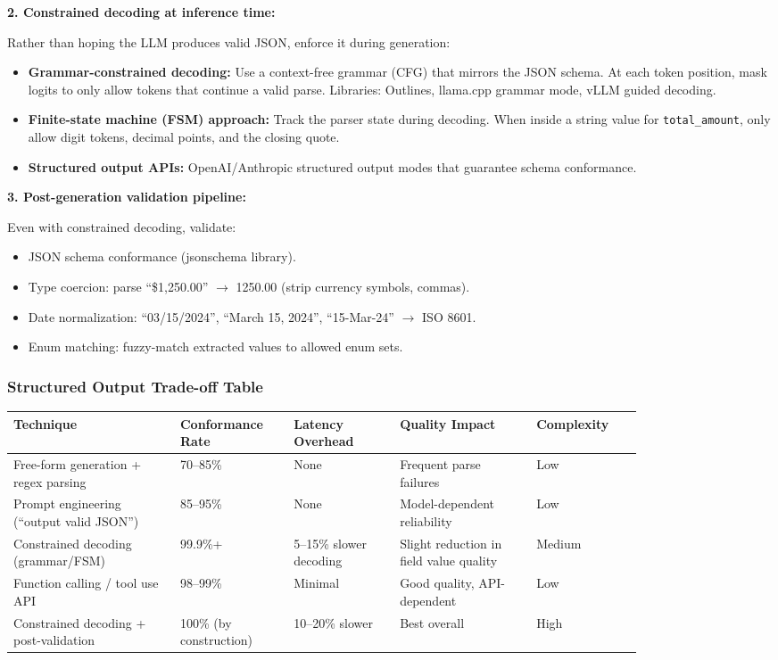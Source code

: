 \textbf{2. Constrained decoding at inference time:}

Rather than hoping the LLM produces valid JSON, enforce it during generation:

\begin{itemize}
  \item \textbf{Grammar-constrained decoding:} Use a context-free grammar (CFG) that mirrors the JSON schema. At each token position, mask logits to only allow tokens that continue a valid parse. Libraries: Outlines, llama.cpp grammar mode, vLLM guided decoding.
  \item \textbf{Finite-state machine (FSM) approach:} Track the parser state during decoding. When inside a string value for \texttt{total\_amount}, only allow digit tokens, decimal points, and the closing quote.
  \item \textbf{Structured output APIs:} OpenAI/Anthropic structured output modes that guarantee schema conformance.
\end{itemize}

\textbf{3. Post-generation validation pipeline:}

Even with constrained decoding, validate:

\begin{itemize}
  \item JSON schema conformance (jsonschema library).
  \item Type coercion: parse ``\$1,250.00'' $\rightarrow$ 1250.00 (strip currency symbols, commas).
  \item Date normalization: ``03/15/2024'', ``March 15, 2024'', ``15-Mar-24'' $\rightarrow$ ISO 8601.
  \item Enum matching: fuzzy-match extracted values to allowed enum sets.
\end{itemize}

\subsubsection*{Structured Output Trade-off Table}

\begin{tabular}{|p{0.22\linewidth}|p{0.14\linewidth}|p{0.14\linewidth}|p{0.18\linewidth}|p{0.14\linewidth}|}
\hline
\textbf{Technique} & \textbf{Conformance Rate} & \textbf{Latency Overhead} & \textbf{Quality Impact} & \textbf{Complexity} \\
\hline
Free-form generation + regex parsing & 70--85\% & None & Frequent parse failures & Low \\
\hline
Prompt engineering (``output valid JSON'') & 85--95\% & None & Model-dependent reliability & Low \\
\hline
Constrained decoding (grammar/FSM) & 99.9\%+ & 5--15\% slower decoding & Slight reduction in field value quality & Medium \\
\hline
Function calling / tool use API & 98--99\% & Minimal & Good quality, API-dependent & Low \\
\hline
Constrained decoding + post-validation & 100\% (by construction) & 10--20\% slower & Best overall & High \\
\hline
\end{tabular}

